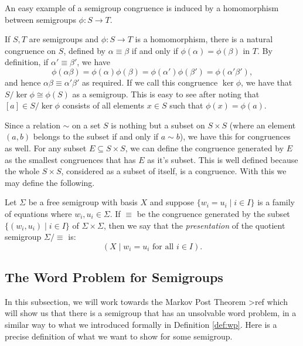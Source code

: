 An easy example of a semigroup congruence is induced by a homomorphism between semigroups $\phi:S \rightarrow T$.

\begin{example}
  If $S,T$ are semigroups and $\phi:S \rightarrow T$ is a homomorphism, there is a natural congruence on $S$, defined by $\alpha \equiv \beta$ if and only if $\phi(\alpha) = \phi(\beta)$ in $T$. By definition, if $\alpha' \equiv \beta'$, we have
  \begin{equation*}
    \phi(\alpha\beta) = \phi(\alpha)\phi(\beta) = \phi(\alpha')\phi(\beta') = \phi(\alpha'\beta'),
  \end{equation*}
  and hence $\alpha\beta \equiv \alpha'\beta'$ as required. If we call this congruence $\ker \phi$, we have that $S/\ker \phi \cong \phi(S)$ as a semigroup. This is easy to see after noting that $[a] \in S/\ker \phi$ consists of all elements $x \in S$ such that $\phi(x) = \phi(a)$.
\end{example}

Since a relation $\sim$ on a set $S$ is nothing but a subset on $S \times S$ (where an element $(a,b)$ belongs to the subset if and only if $a \sim b$), we have this for congruences as well. For any subset $E \subseteq S \times S$, we can define the congruence generated by $E$ as the smallest congruences that has $E$ as it's subset. This is well defined because the whole $S \times S$, considered as a subset of itself, is a congruence. With this we may define the following.

\begin{definition}
  Let $\Sigma$ be a free semigroup with basis $X$ and suppose $\{w_i = u_i \mid i \in I \}$ is a family of equations where $w_i,u_i \in \Sigma$. If $\equiv$ be the congruence generated by the subset $\{(w_i,u_i) \mid i \in I \}$ of $\Sigma \times \Sigma$, then we say that the \emph{presentation} of the quotient semigroup $\Sigma/\equiv$ is:
  \begin{equation*}
    (X \mid w_i = u_i \text{ for all } i \in I).
  \end{equation*}
\end{definition}

\subsection{The Word Problem for Semigroups}
\label{sec:mpt:wps}

In this subsection, we will work towards the Markov Post Theorem >ref which will show us that there is a semigroup that has an unsolvable word problem, in a similar way to what we introduced formally in Definition \ref{def:wp}. Here is a precise definition of what we want to show for some semigroup.

